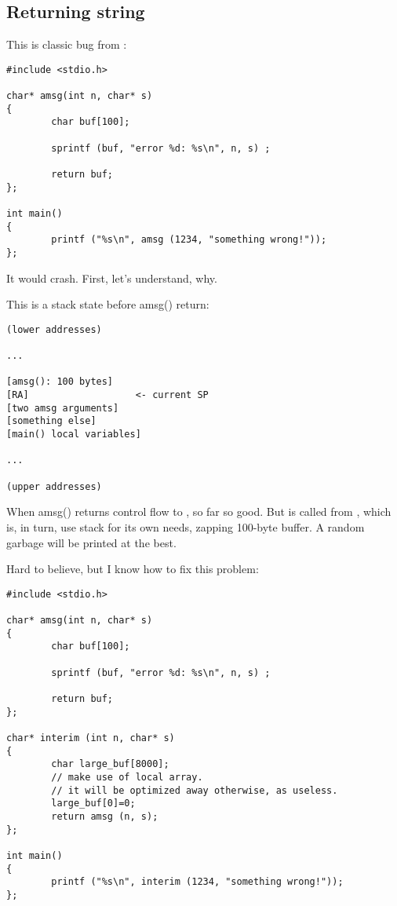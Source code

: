 \subsection{Returning string}

This is classic bug from \RobPikePractice{}:

\begin{lstlisting}[style=customc]
#include <stdio.h>

char* amsg(int n, char* s)
{
        char buf[100];

        sprintf (buf, "error %d: %s\n", n, s) ;

        return buf;
};

int main()
{
        printf ("%s\n", amsg (1234, "something wrong!"));
};
\end{lstlisting}

It would crash.
First, let's understand, why.

This is a stack state before amsg() return:

\begin{lstlisting}
(lower addresses)

...

[amsg(): 100 bytes]
[RA]                   <- current SP
[two amsg arguments]
[something else]
[main() local variables]

...

(upper addresses)
\end{lstlisting}

When amsg() returns control flow to \main, so far so good.
But \printf is called from \main, which is, in turn, use stack for its own needs, zapping 100-byte buffer.
A random garbage will be printed at the best.

Hard to believe, but I know how to fix this problem:

\begin{lstlisting}[style=customc]
#include <stdio.h>

char* amsg(int n, char* s)
{
        char buf[100];

        sprintf (buf, "error %d: %s\n", n, s) ;

        return buf;
};

char* interim (int n, char* s)
{
        char large_buf[8000];
        // make use of local array.
        // it will be optimized away otherwise, as useless.
        large_buf[0]=0;
        return amsg (n, s);
};

int main()
{
        printf ("%s\n", interim (1234, "something wrong!"));
};
\end{lstlisting}

